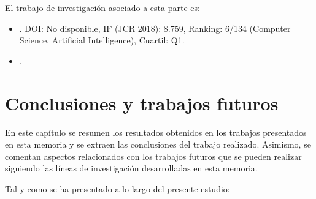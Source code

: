 \documentclass[c5paper,10pt,twoside]{book}	   	%
\begin{document}
\pagebreak

El trabajo de investigación asociado a esta parte es:

\begin{itemize}
	\item {}. DOI: No disponible, IF (JCR 2018): 8.759, Ranking: 6/134 (Computer Science, Artificial Intelligence), Cuartil: Q1.
	
	\item {}.
\end{itemize}






\clearpage{} \cleardoublepage
\clearpage{}

\chapter{Conclusiones y trabajos futuros} \label{chap:conclusion}

En este capítulo se resumen los resultados obtenidos en los trabajos presentados en esta memoria y se extraen las conclusiones del trabajo realizado. Asimismo, se comentan aspectos relacionados con los trabajos futuros que se pueden realizar siguiendo las líneas de investigación desarrolladas en esta memoria.



Tal y como se ha presentado a lo largo del presente estudio:
\end{document}

